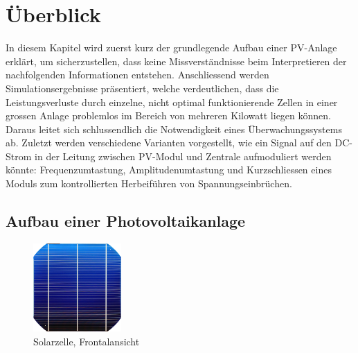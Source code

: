 \chapter{\"Uberblick}
\label{chap:uberblick}

In   diesem  Kapitel   wird  zuerst   kurz  der   grundlegende  Aufbau   einer
PV-Anlage  erkl\"art,  um   sicherzustellen,  dass  keine  Missverst\"andnisse
beim Interpretieren  der nachfolgenden  Informationen entstehen. Anschliessend
werden  Simulationsergebnisse pr\"asentiert,  welche  verdeutlichen, dass  die
Leistungsverluste  durch   einzelne,  nicht  optimal   funktionierende  Zellen
in  einer  grossen   Anlage  problemlos  im  Bereich   von  mehreren  Kilowatt
liegen  k\"onnen. Daraus leitet  sich schlussendlich  die Notwendigkeit  eines
\"Uberwachungssystems ab. Zuletzt  werden verschiedene  Varianten vorgestellt,
wie  ein  Signal  auf  den  DC-Strom in  der  Leitung  zwischen  PV-Modul  und
Zentrale aufmoduliert  werden k\"onnte: Frequenzumtastung, Amplitudenumtastung
und  Kurzschliessen   eines  Moduls  zum  kontrollierten   Herbeif\"uhren  von
Spannungseinbr\"uchen.


\section{Aufbau einer Photovoltaikanlage}
\label{sec:solaranlage:aufbau}

\enlargethispage{1em}
\begin{figure}
    \centering
    \includegraphics[width=0.30\textwidth]{images/solar-facility/cell--400px.png}
    \caption[Bild einer PV-Zelle]
    {Solarzelle, Frontalansicht \cite{ref:pvcell:wikipedia}}
    \label{fig:pvcell:front}
    \vspace*{-1em}
\end{figure}

